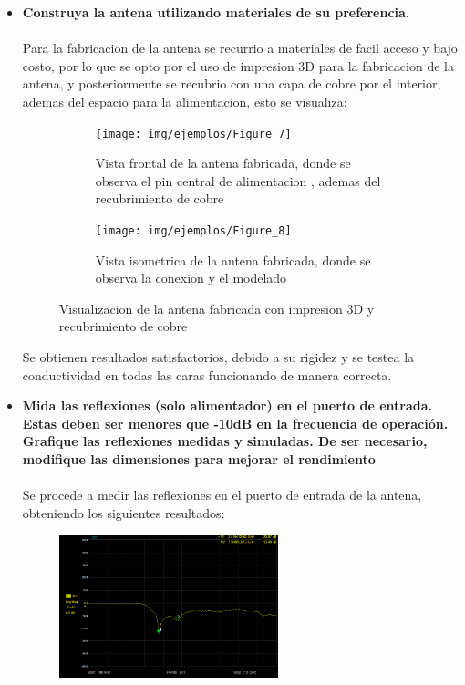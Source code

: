 \begin{itemize}
		\newpage
		\item \textbf{Construya la antena utilizando materiales de su preferencia.}\\\\
		Para la fabricacion de la antena se recurrio a materiales de facil acceso y bajo costo, por lo que se opto por el uso de impresion 3D para la fabricacion de la antena, y posteriormente se recubrio con una capa de cobre por el interior, ademas del espacio para la alimentacion, esto se visualiza:
		\begin{figure}[H]
			\centering
			\begin{subfigure}[b]{0.45\textwidth}
				\centering
				\texttt{[image: img/ejemplos/Figure\_7]}
				\caption{Vista frontal de la antena fabricada, donde se observa el pin central de alimentacion , ademas del recubrimiento de cobre}
				\label{fig:antena_cobre1}
			\end{subfigure}
			\hfill
			\begin{subfigure}[b]{0.45\textwidth}
				\centering
				\texttt{[image: img/ejemplos/Figure\_8]}
				\caption{Vista isometrica de la antena fabricada, donde se observa la conexion y el modelado}
				\label{fig:antena_cobre2}
			\end{subfigure}
			\caption{Visualizacion de la antena fabricada con impresion 3D y recubrimiento de cobre}
			\label{fig:antenacobre1}
		\end{figure}
		Se obtienen resultados satisfactorios, debido a su rigidez y se testea la conductividad en todas las caras funcionando de manera correcta.
		\newpage
		\item \textbf{Mida las reflexiones (solo alimentador) en el puerto de entrada. Estas deben ser menores que -10dB en la frecuencia de operación. Grafique las reflexiones medidas y simuladas. De ser necesario, modifique las dimensiones para mejorar el rendimiento}\\\\
		Se procede a medir las reflexiones en el puerto de entrada de la antena, obteniendo los siguientes resultados:
		\begin{figure}
			\centering
			\includegraphics[width=0.6\textwidth]{img/ejemplos/Figure_9}

\end{figure}
\end{itemize}
